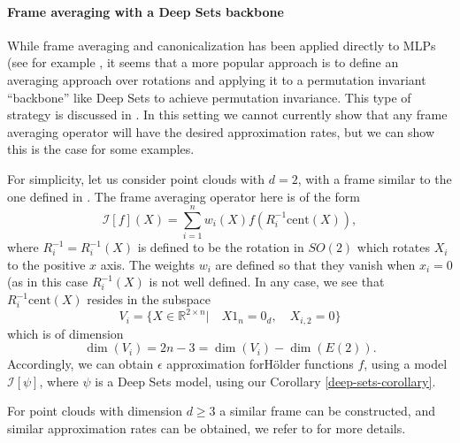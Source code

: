 \documentclass[twoside,11pt]{article}
\newcommand{\RR}{\mathbb{R}}
\newcommand{\cent}{\mathrm{cent}}
\begin{document}
\paragraph{Frame averaging with a Deep Sets backbone}
While frame averaging and canonicalization has been applied directly to MLPs (see for example \cite{friedmann2025canonnetcanonicalorderingcurvature}, it seems that a more popular approach is to define an averaging approach over rotations and applying it to a permutation invariant ``backbone'' like Deep Sets  to achieve permutation invariance. This type of strategy is discussed in \cite{pozdnyakov2023smooth,punyframe,dym2024equivariant}. In this setting we cannot currently show that any frame averaging operator will have the desired approximation rates, but we can show this is the case for some examples. 

For simplicity, let us consider point clouds with $d=2$, with a frame similar to the one  defined in \cite{pozdnyakov2023smooth,dym2024equivariant}. The frame averaging operator here is of the form 
$$\mathcal{I}[f](X)=\sum_{i=1}^n w_i(X)f(R_i^{-1}\cent(X)), $$
where $R_i^{-1}=R_i^{-1}(X) $ is defined to be the rotation in $SO(2)$ which rotates $X_i$ to the positive $x$ axis. The weights $w_i$ are defined so that they vanish when $x_i=0$ (as in this case $R_i^{-1}(X)$ is not well defined. In any case, we see that 
$R_i^{-1}\cent(X)$ resides in the subspace 
$$V_i=\{X\in \RR^{2\times n}| \quad X1_n=0_d, \quad X_{i,2}=0 \} $$
which is of dimension 
$$\dim(V_i)=2n-3=\dim(V_i)-\dim(E(2)).  $$
Accordingly, we can obtain $\epsilon$ approximation forH\"older functions $f$, using a model $\mathcal{I}[\psi]$, where $\psi$ is a Deep Sets model, using our Corollary \ref{deep-sets-corollary}. 

For point clouds with dimension $d\geq 3$ a similar frame can be constructed, and similar approximation rates can be obtained, we refer to \cite{pozdnyakov2023smooth,dym2024equivariant} for more details. 
\end{document}
